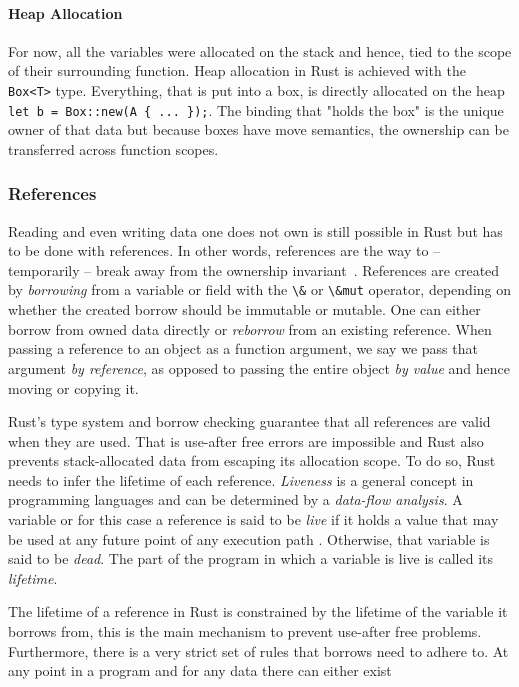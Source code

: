\paragraph{Heap Allocation}

For now, all the variables were allocated on the stack and hence, tied to the
scope of their surrounding function. Heap allocation in Rust is achieved with
the \lstinline!Box<T>! type. Everything, that is put into a box, is directly
allocated on the heap \passthrough{\lstinline!let b = Box::new(A \{ ... \});!}.
The binding that "holds the box" is the unique owner  of that data but because
boxes have move semantics, the ownership can be transferred across function
scopes.

\subsubsection{References}

Reading and even writing data one does not own is still possible in Rust but has
to be done with references. In other words, references are the way to --
temporarily -- break away from the ownership
invariant~\cite{lightweight-formalism}. References are created by
\emph{borrowing} from a variable or field with the \lstinline!\&! or
\lstinline!\&mut! operator, depending on whether the created borrow should be
immutable or mutable. One can either borrow from owned data directly or
\emph{reborrow} from an existing reference. When passing a reference to an
object as a function argument, we say we pass that argument \emph{by reference},
as opposed to passing the entire object \emph{by value} and hence moving or
copying it.

Rust's type system and borrow checking guarantee that all references are valid
when they are used. That is use-after free errors are impossible and Rust also
prevents stack-allocated data from escaping its allocation scope. To do so, Rust
needs to infer the lifetime of each reference. \emph{Liveness} is a general
concept in programming languages and can be determined by a \emph{data-flow
analysis}. A variable or for this case a reference is said to be \emph{live} if
it holds a value that may be used at any future point of any execution path
\cite{wiki:live-vars}. Otherwise, that variable is said to be \emph{dead}. The
part of the program in which a variable is live is called its \emph{lifetime}.

The lifetime of a reference in Rust is constrained by the lifetime of the
variable it borrows from, this is the main  mechanism to prevent use-after free
problems. Furthermore, there is a very strict set of rules that borrows need to
adhere to. At any point in a program and for any data there can either exist

